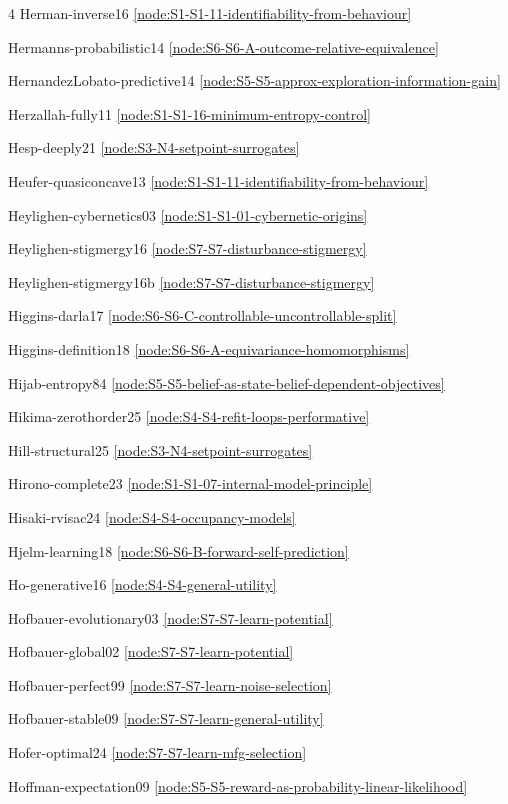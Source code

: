 \documentclass[10pt]{article}
\begin{document}
{\begin{multicols}{4}
Herman-inverse16 \hfill \ref{node:S1-S1-11-identifiability-from-behaviour}\par
Hermanns-probabilistic14 \hfill \ref{node:S6-S6-A-outcome-relative-equivalence}\par
HernandezLobato-predictive14 \hfill \ref{node:S5-S5-approx-exploration-information-gain}\par
Herzallah-fully11 \hfill \ref{node:S1-S1-16-minimum-entropy-control}\par
Hesp-deeply21 \hfill \ref{node:S3-N4-setpoint-surrogates}\par
Heufer-quasiconcave13 \hfill \ref{node:S1-S1-11-identifiability-from-behaviour}\par
Heylighen-cybernetics03 \hfill \ref{node:S1-S1-01-cybernetic-origins}\par
Heylighen-stigmergy16 \hfill \ref{node:S7-S7-disturbance-stigmergy}\par
Heylighen-stigmergy16b \hfill \ref{node:S7-S7-disturbance-stigmergy}\par
Higgins-darla17 \hfill \ref{node:S6-S6-C-controllable-uncontrollable-split}\par
Higgins-definition18 \hfill \ref{node:S6-S6-A-equivariance-homomorphisms}\par
Hijab-entropy84 \hfill \ref{node:S5-S5-belief-as-state-belief-dependent-objectives}\par
Hikima-zerothorder25 \hfill \ref{node:S4-S4-refit-loops-performative}\par
Hill-structural25 \hfill \ref{node:S3-N4-setpoint-surrogates}\par
Hirono-complete23 \hfill \ref{node:S1-S1-07-internal-model-principle}\par
Hisaki-rvisac24 \hfill \ref{node:S4-S4-occupancy-models}\par
Hjelm-learning18 \hfill \ref{node:S6-S6-B-forward-self-prediction}\par
Ho-generative16 \hfill \ref{node:S4-S4-general-utility}\par
Hofbauer-evolutionary03 \hfill \ref{node:S7-S7-learn-potential}\par
Hofbauer-global02 \hfill \ref{node:S7-S7-learn-potential}\par
Hofbauer-perfect99 \hfill \ref{node:S7-S7-learn-noise-selection}\par
Hofbauer-stable09 \hfill \ref{node:S7-S7-learn-general-utility}\par
Hofer-optimal24 \hfill \ref{node:S7-S7-learn-mfg-selection}\par
Hoffman-expectation09 \hfill \ref{node:S5-S5-reward-as-probability-linear-likelihood}\par

\end{multicols}}
\end{document}
